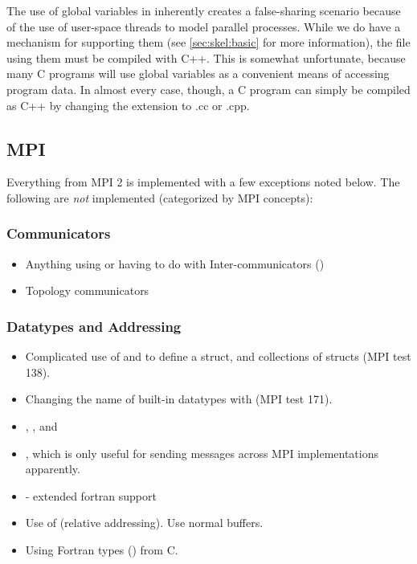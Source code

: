 The use of global variables in \sstmacro inherently creates a false-sharing scenario 
because of the use of user-space threads to model parallel processes.   
While we do have a mechanism for supporting them (see \ref{sec:skel:basic} for more information), 
the file using them must be compiled with C++.   
This is somewhat unfortunate, because many C programs will use global variables as a convenient means of accessing program data.   
In almost every case, though, a C program can simply be compiled as C++ by changing the extension to .cc or .cpp.

\subsection{MPI}
\label{subsec:issues:mpi}

Everything from MPI 2 is implemented with a few exceptions noted below.  
The following are \textit{not} implemented (categorized by MPI concepts):

\subsubsection{Communicators}
\label{subsubsec:issues:mpi:comm}

\begin{itemize}
\item Anything using or having to do with Inter-communicators ()
\item Topology communicators
\end{itemize}

\subsubsection{Datatypes and Addressing}
\label{subsubsec:issues:mpi:types}

\begin{itemize}
\item Complicated use of  and  to define a struct, and collections of structs (MPI test 138). 
\item Changing the name of built-in datatypes with  (MPI test 171).
\item {}, , and 
\item {}, which is only useful for sending messages across MPI implementations apparently.
\item {}  - extended fortran support
\item Use of  (relative addressing).  Use normal buffers. 
\item Using Fortran types (\eg {}) from C.
\end{itemize}


